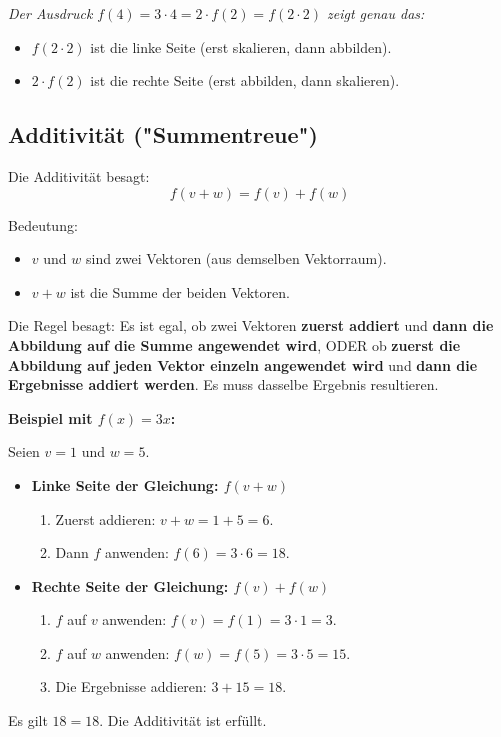 \textit{Der Ausdruck $f(4) = 3 \cdot 4 = 2 \cdot f(2) = f(2 \cdot 2)$ zeigt genau das:}
\begin{itemize}
    \item $f(2 \cdot 2)$ ist die linke Seite (erst skalieren, dann abbilden).
    \item $2 \cdot f(2)$ ist die rechte Seite (erst abbilden, dann skalieren).
\end{itemize}

\subsection{Additivität ("Summentreue")}

Die Additivität besagt: $$f(v + w) = f(v) + f(w)$$

Bedeutung:
\begin{itemize}
    \item $v$ und $w$ sind zwei Vektoren (aus demselben Vektorraum).
    \item $v+w$ ist die Summe der beiden Vektoren.
\end{itemize}
Die Regel besagt: Es ist egal, ob zwei Vektoren \textbf{zuerst addiert} und \textbf{dann die Abbildung auf die Summe angewendet wird}, ODER ob \textbf{zuerst die Abbildung auf jeden Vektor einzeln angewendet wird} und \textbf{dann die Ergebnisse addiert werden}. Es muss dasselbe Ergebnis resultieren.

\textbf{Beispiel mit $f(x) = 3x$:}

Seien $v=1$ und $w=5$.
\begin{itemize}
    \item \textbf{Linke Seite der Gleichung: $f(v+w)$}
          \begin{enumerate}
              \item Zuerst addieren: $v+w = 1+5 = 6$.
              \item Dann $f$ anwenden: $f(6) = 3 \cdot 6 = 18$.
          \end{enumerate}
    \item \textbf{Rechte Seite der Gleichung: $f(v) + f(w)$}
          \begin{enumerate}
              \item $f$ auf $v$ anwenden: $f(v) = f(1) = 3 \cdot 1 = 3$.
              \item $f$ auf $w$ anwenden: $f(w) = f(5) = 3 \cdot 5 = 15$.
              \item Die Ergebnisse addieren: $3 + 15 = 18$.
          \end{enumerate}
\end{itemize}
Es gilt $18 = 18$. Die Additivität ist erfüllt.


